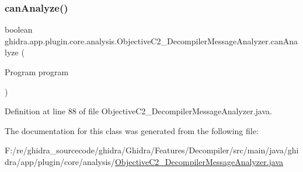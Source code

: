 \subsubsection{\texorpdfstring{canAnalyze()}{canAnalyze()}}
{\footnotesize\ttfamily boolean ghidra.\+app.\+plugin.\+core.\+analysis.\+Objective\+C2\+\_\+\+Decompiler\+Message\+Analyzer.\+can\+Analyze (\begin{DoxyParamCaption}\item[{Program}]{program }\end{DoxyParamCaption})\hspace{0.3cm}{\ttfamily [inline]}}



Definition at line 88 of file Objective\+C2\+\_\+\+Decompiler\+Message\+Analyzer.\+java.



The documentation for this class was generated from the following file\+:\begin{DoxyCompactItemize}
\item 
F\+:/re/ghidra\+\_\+sourcecode/ghidra/\+Ghidra/\+Features/\+Decompiler/src/main/java/ghidra/app/plugin/core/analysis/\mbox{\hyperlink{_objective_c2___decompiler_message_analyzer_8java}{Objective\+C2\+\_\+\+Decompiler\+Message\+Analyzer.\+java}}\end{DoxyCompactItemize}
